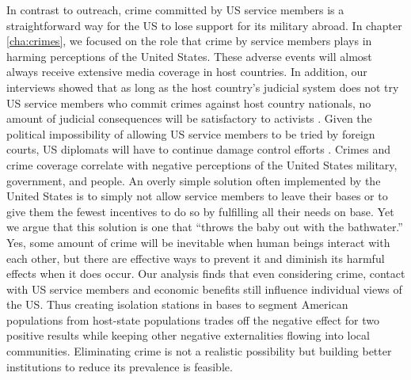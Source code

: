 In contrast to outreach, crime committed by US service members is a straightforward way for the US to lose support for its military abroad. In chapter \ref{cha:crimes}, we focused on the role that crime by service members plays in harming perceptions of the United States. These adverse events will almost always receive extensive media coverage in host countries. In addition, our interviews  showed that as long as the host country's judicial system does not try US service members who commit crimes against host country nationals, no amount of judicial consequences will be satisfactory to activists \cite{amb20180713}. Given the political impossibility of allowing US service members to be tried by foreign courts, US diplomats will have to continue damage control efforts \cite{Freeman2021}. Crimes and crime coverage correlate with negative perceptions of the United States military, government, and people. An overly simple solution often implemented by the United States is to simply not allow service members to leave their bases or to give them the fewest incentives to do so by fulfilling all their needs on base. Yet we argue that this solution is one that ``throws the baby out with the bathwater.'' Yes, some amount of crime will be inevitable when human beings interact with each other, but there are effective ways to prevent it and diminish its harmful effects when it does occur. Our analysis finds that even considering crime, contact with US service members and economic benefits still influence individual views of the US. Thus creating isolation stations in bases to segment American populations from host-state populations trades off the negative effect for two positive results while keeping other negative externalities flowing into local communities. Eliminating crime is not a realistic possibility but building better institutions to reduce its prevalence is feasible.


